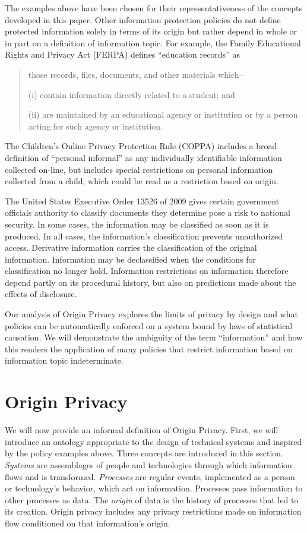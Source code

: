 \documentclass[../thesis.tex]{subfiles}
\begin{document}
The examples above have been chosen for their representativeness
of the concepts developed in this paper.
Other information protection policies do not define protected
information solely in terms of its origin but rather depend
in whole or in part on
a definition of information topic. For example,
the Family Educational Rights and Privacy Act (FERPA)
defines ``education records'' as
\begin{quote}
  those records, files, documents, and other materials which--
  
  (i) contain information directly related to a student; and

  (ii) are maintained by an educational agency or institution or by a person acting for such agency or institution.
\end{quote}

The Children's Online Privacy Protection Rule (COPPA)
includes a broad definition of ``personal informal''
as any individually identifiable information collected
on-line, but includes special restrictions on personal
information collected from a child, which could be
read as a restriction based on origin.

The United States Executive Order 13526 of 2009
gives certain government officials authority to classify
documents they determine pose a risk to national
security.
In some cases, the information may be classified
as soon as it is produced.
In all cases, the information's classification
prevents unauthorized access.
Derivative information carries the classification
of the original information.
Information may be declassified when the
conditions for classification no longer hold.
Information restrictions on information
therefore depend partly on its procedural history,
but also on predictions made about the effects of
disclosure.

Our analysis of Origin Privacy explores the
limits of privacy by design and what policies
can be automatically enforced on a system
bound by laws of statistical causation.
We will demonstrate the ambiguity of
the term ``information'' and how this
renders the application of many policies
that restrict information based on information
topic indeterminate.


\section{Origin Privacy}
\label{sec:ontology}

We will now provide an informal definition of Origin Privacy.
First, we will introduce an ontology appropriate to the
design of technical systems and inspired by the policy
examples above.
Three concepts are introduced in this section.
\emph{Systems} are assemblages of people and technologies
through which information flows and is transformed.
\emph{Processes} are regular events, implemented as
a person or technology's behavior, which act on
information.
Processes pass information to other processes as data.
The \emph{origin} of data is the history of processes
that led to its creation.
Origin privacy includes any privacy restrictions made
on information flow conditioned on that information's
origin.
\end{document}

